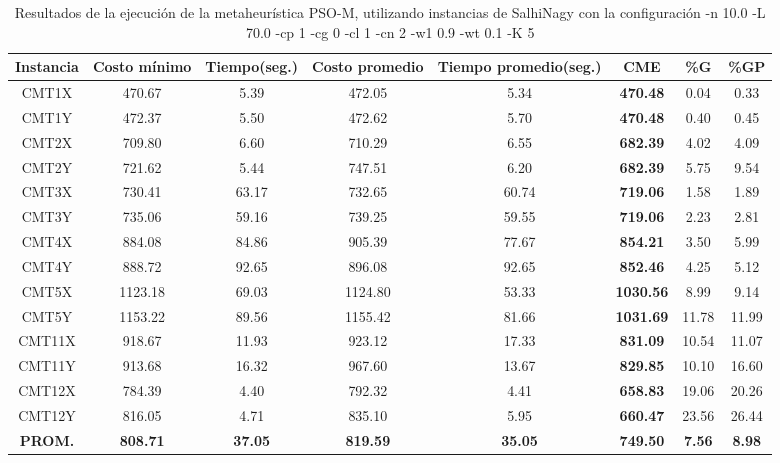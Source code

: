 \begin{table}[h]
\caption{Resultados de la ejecución de la metaheurística PSO-M, utilizando instancias de SalhiNagy con la configuración -n 10.0 -L 70.0 -cp 1 -cg 0 -cl 1 -cn 2 -w1 0.9 -wt 0.1 -K 5}
\centering
\small
\begin{tabular}{c c c c c c c c}
\hline\hline
Instancia & Costo mínimo & Tiempo(seg.) & Costo promedio & Tiempo promedio(seg.) & CME & \%G & \%GP \\ [0.5ex]
\hline
CMT1X & 470.67 & 5.39 & 
472.05 & 5.34 & \bf{470.48} & 
0.04 & 0.33\\CMT1Y & 472.37 & 5.50 & 
472.62 & 5.70 & \bf{470.48} & 
0.40 & 0.45\\CMT2X & 709.80 & 6.60 & 
710.29 & 6.55 & \bf{682.39} & 
4.02 & 4.09\\CMT2Y & 721.62 & 5.44 & 
747.51 & 6.20 & \bf{682.39} & 
5.75 & 9.54\\CMT3X & 730.41 & 63.17 & 
732.65 & 60.74 & \bf{719.06} & 
1.58 & 1.89\\CMT3Y & 735.06 & 59.16 & 
739.25 & 59.55 & \bf{719.06} & 
2.23 & 2.81\\CMT4X & 884.08 & 84.86 & 
905.39 & 77.67 & \bf{854.21} & 
3.50 & 5.99\\CMT4Y & 888.72 & 92.65 & 
896.08 & 92.65 & \bf{852.46} & 
4.25 & 5.12\\CMT5X & 1123.18 & 69.03 & 
1124.80 & 53.33 & \bf{1030.56} & 
8.99 & 9.14\\CMT5Y & 1153.22 & 89.56 & 
1155.42 & 81.66 & \bf{1031.69} & 
11.78 & 11.99\\CMT11X & 918.67 & 11.93 & 
923.12 & 17.33 & \bf{831.09} & 
10.54 & 11.07\\CMT11Y & 913.68 & 16.32 & 
967.60 & 13.67 & \bf{829.85} & 
10.10 & 16.60\\CMT12X & 784.39 & 4.40 & 
792.32 & 4.41 & \bf{658.83} & 
19.06 & 20.26\\CMT12Y & 816.05 & 4.71 & 
835.10 & 5.95 & \bf{660.47} & 
23.56 & 26.44\\\bf{PROM.} & 
\bf{808.71} & \bf{37.05} & \bf{819.59} & \bf{35.05} & \bf{749.50} & \bf{7.56} & \bf{8.98}\\[1ex]\hline
\end{tabular}
\label{table:nonlin}
\end{table}
